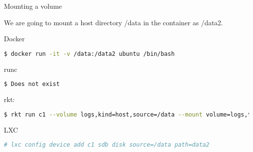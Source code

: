 \begin{frame}[fragile]{Mounting a volume}

We are going to mount a host directory /data in the container as /data2.

\begin{block}{Docker}
\begin{lstlisting}[language=bash,keywordstyle=\bf,stringstyle=\it,basicstyle=\tiny]
$ docker run -it -v /data:/data2 ubuntu /bin/bash

\end{lstlisting}
\end{block}

\begin{block}{runc}
\begin{lstlisting}[language=bash,keywordstyle=\bf,stringstyle=\it,basicstyle=\tiny]
$ Does not exist 
\end{lstlisting}
\end{block}



\begin{block}{rkt:}
\begin{lstlisting}[language=bash,keywordstyle=\bf,stringstyle=\it,basicstyle=\tiny]
$ rkt run c1 --volume logs,kind=host,source=/data --mount volume=logs,target=/data2
\end{lstlisting}
\end{block}

\begin{block}{LXC}
\begin{lstlisting}[language=bash,keywordstyle=\bf,stringstyle=\it,basicstyle=\tiny]
# lxc config device add c1 sdb disk source=/data path=data2
\end{lstlisting}
\end{block}

\end{frame}